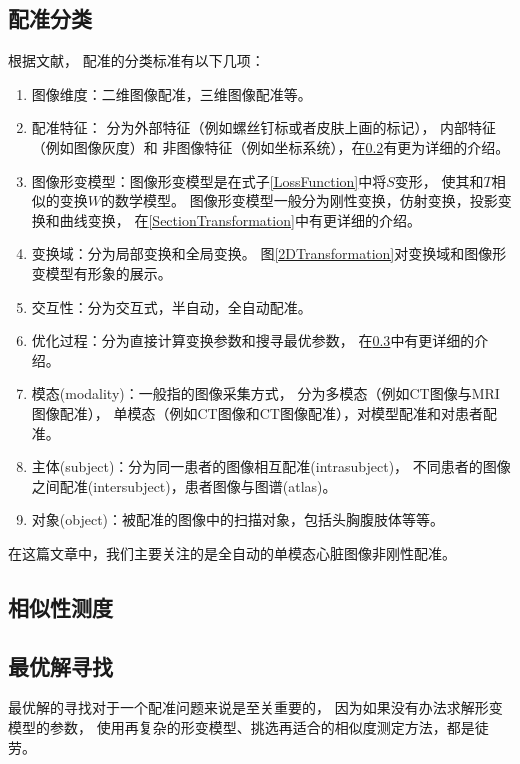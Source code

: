 \subsection{配准分类}\label{RegistrationClassification}
根据文献\cite{RegistrationSurvey,RegistrationSurveyNew}，
配准的分类标准有以下几项：
\begin{enumerate}
  \item 图像维度：二维图像配准，三维图像配准等。
  \item 配准特征：
    分为外部特征（例如螺丝钉标或者皮肤上画的标记），
    内部特征（例如图像灰度）和
    非图像特征（例如坐标系统），在\ref{SectionMetric}有更为详细的介绍。
  \item 图像形变模型：图像形变模型是在式子\ref{LossFunction}中将$S$变形，
    使其和$T$相似的变换$W$的数学模型。
    图像形变模型一般分为刚性变换，仿射变换，投影变换和曲线变换，
    在\ref{SectionTransformation}中有更详细的介绍。
  \item 变换域：分为局部变换和全局变换。
    图\ref{2DTransformation}对变换域和图像形变模型有形象的展示。
  \item 交互性：分为交互式，半自动，全自动配准。
  \item 优化过程：分为直接计算变换参数和搜寻最优参数，
    在\ref{SectionOptimization}中有更详细的介绍。
  \item 模态(modality)：一般指的图像采集方式，
    分为多模态（例如CT图像与MRI图像配准），
    单模态（例如CT图像和CT图像配准），对模型配准和对患者配准。
  \item 主体(subject)：分为同一患者的图像相互配准(intrasubject)，
    不同患者的图像之间配准(intersubject)，患者图像与图谱(atlas)。
  \item 对象(object)：被配准的图像中的扫描对象，包括头胸腹肢体等等。
\end{enumerate}

在这篇文章中，我们主要关注的是全自动的单模态心脏图像非刚性配准。


\subsection{相似性测度}\label{SectionMetric}



\subsection{最优解寻找}\label{SectionOptimization}
最优解的寻找对于一个配准问题来说是至关重要的，
因为如果没有办法求解形变模型的参数，
使用再复杂的形变模型、挑选再适合的相似度测定方法，都是徒劳。


